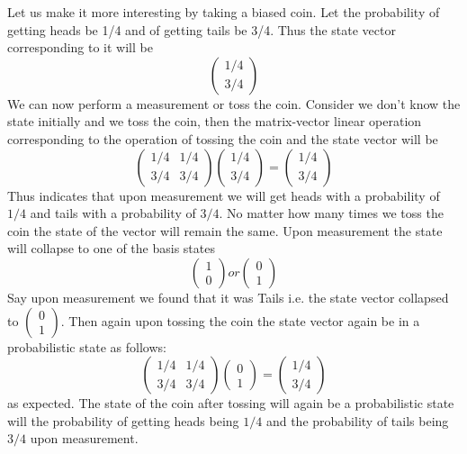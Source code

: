 Let us make it more interesting by taking a biased coin. Let the probability of getting heads be 1/4 and of getting tails be 3/4. Thus the state vector corresponding to it will be
\[
\begin{pmatrix} 1/4 \\ 3/4 \end{pmatrix}
\]
We can now perform a measurement or toss the coin. Consider we don't know the state initially and we toss the coin, then the matrix-vector linear operation corresponding to the operation of tossing the coin and the state vector will be
\[
\begin{pmatrix} 1/4 & 1/4 \\ 3/4 & 3/4 \end{pmatrix}\begin{pmatrix} 1/4 \\ 3/4 \end{pmatrix} = \begin{pmatrix} 1/4 \\ 3/4 \end{pmatrix}
\]
Thus indicates that upon measurement we will get heads with a probability of $1/4$ and tails with a probability of $3/4$. No matter how many times we toss the coin the state of the vector will remain the same. Upon measurement the state will collapse to one of the basis states
\[
\begin{pmatrix} 1 \\ 0 \end{pmatrix} or \begin{pmatrix} 0 \\1 \end{pmatrix}
\]
Say upon measurement we found that it was Tails i.e. the state vector collapsed to $\begin{pmatrix} 0 \\1\end{pmatrix}$. Then again upon tossing the coin the state vector again be in a probabilistic state as follows:
\[
\begin{pmatrix} 1/4 & 1/4 \\3/4 & 3/4 \end{pmatrix} \begin{pmatrix} 0 \\ 1 \end{pmatrix} = \begin{pmatrix} 1/4 \\ 3/4\end{pmatrix}
\]
as expected. The state of the coin after tossing will again be a probabilistic state will the probability of getting heads being $1/4$ and the probability of tails being $3/4$ upon measurement.

